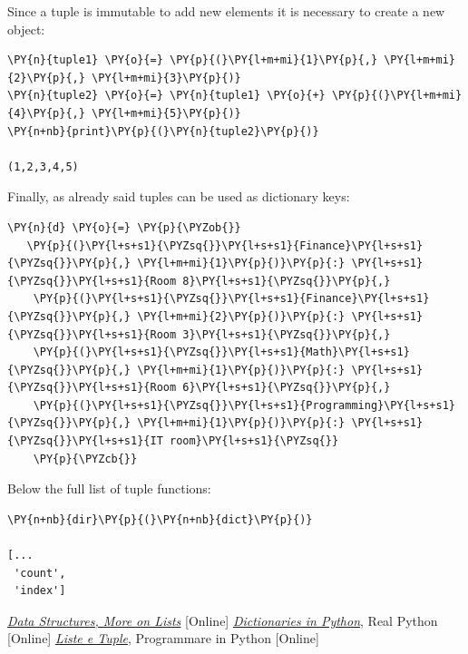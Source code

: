 Since a tuple is immutable to add new elements it is necessary to create a new object:

\begin{codebox}[breakable, size=fbox, boxrule=1pt, pad at break*=1mm, colback=cellbackground, colframe=cellborder]\begin{Verbatim}[commandchars=\\\{\}]
\PY{n}{tuple1} \PY{o}{=} \PY{p}{(}\PY{l+m+mi}{1}\PY{p}{,} \PY{l+m+mi}{2}\PY{p}{,} \PY{l+m+mi}{3}\PY{p}{)}
\PY{n}{tuple2} \PY{o}{=} \PY{n}{tuple1} \PY{o}{+} \PY{p}{(}\PY{l+m+mi}{4}\PY{p}{,} \PY{l+m+mi}{5}\PY{p}{)}
\PY{n+nb}{print}\PY{p}{(}\PY{n}{tuple2}\PY{p}{)}

(1,2,3,4,5)
\end{Verbatim}
\end{codebox}

Finally, as already said tuples can be used as dictionary keys:

\begin{codebox}[breakable, size=fbox, boxrule=1pt, pad at break*=1mm, colback=cellbackground, colframe=cellborder]\begin{Verbatim}[commandchars=\\\{\}]
\PY{n}{d} \PY{o}{=} \PY{p}{\PYZob{}}
   \PY{p}{(}\PY{l+s+s1}{\PYZsq{}}\PY{l+s+s1}{Finance}\PY{l+s+s1}{\PYZsq{}}\PY{p}{,} \PY{l+m+mi}{1}\PY{p}{)}\PY{p}{:} \PY{l+s+s1}{\PYZsq{}}\PY{l+s+s1}{Room 8}\PY{l+s+s1}{\PYZsq{}}\PY{p}{,}
    \PY{p}{(}\PY{l+s+s1}{\PYZsq{}}\PY{l+s+s1}{Finance}\PY{l+s+s1}{\PYZsq{}}\PY{p}{,} \PY{l+m+mi}{2}\PY{p}{)}\PY{p}{:} \PY{l+s+s1}{\PYZsq{}}\PY{l+s+s1}{Room 3}\PY{l+s+s1}{\PYZsq{}}\PY{p}{,}
    \PY{p}{(}\PY{l+s+s1}{\PYZsq{}}\PY{l+s+s1}{Math}\PY{l+s+s1}{\PYZsq{}}\PY{p}{,} \PY{l+m+mi}{1}\PY{p}{)}\PY{p}{:} \PY{l+s+s1}{\PYZsq{}}\PY{l+s+s1}{Room 6}\PY{l+s+s1}{\PYZsq{}}\PY{p}{,}
    \PY{p}{(}\PY{l+s+s1}{\PYZsq{}}\PY{l+s+s1}{Programming}\PY{l+s+s1}{\PYZsq{}}\PY{p}{,} \PY{l+m+mi}{1}\PY{p}{)}\PY{p}{:} \PY{l+s+s1}{\PYZsq{}}\PY{l+s+s1}{IT room}\PY{l+s+s1}{\PYZsq{}}
    \PY{p}{\PYZcb{}}
\end{Verbatim}
\end{codebox}

Below the full list of tuple functions:
\begin{codebox}[breakable, size=fbox, boxrule=1pt, pad at break*=1mm,colback=cellbackground, colframe=cellborder]
\begin{Verbatim}[commandchars=\\\{\}]
\PY{n+nb}{dir}\PY{p}{(}\PY{n+nb}{dict}\PY{p}{)}

[...
 'count',
 'index']
\end{Verbatim}
\end{codebox}

\begin{thebibliography}{9}
 \href{https://docs.python.org/3/tutorial/datastructures.html}{\emph{Data Structures, More on Lists}} [Online]
 \href{https://realpython.com/python-dicts/}{\emph{Dictionaries in Python}}, Real Python [Online]
 \href{https://www.programmareinpython.it/video-corso-python-base/14-liste-e-tuple/}{\emph{Liste e Tuple}}, Programmare in Python [Online]
\end{thebibliography}

